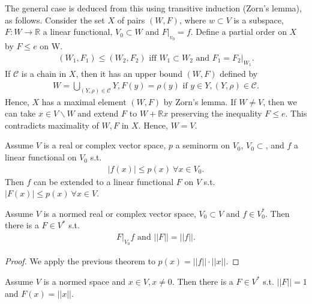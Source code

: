 The general case is deduced from this using transitive induction (Zorn's lemma), as follows. Consider the set \(X\) of pairs \((W,F)\), 
where \(w\subset V\) is a subspace, \(F:W\rightarrow \mathbb{R}\) a linear functional, \(V_0\subset W\) and \(F\vert_{v_0} = f\). Define
a partial order on \(X\) by \(F\leq e\) on W. 
\begin{align*}
    (W_1, F_1) \leq (W_2, F_2) \text{ iff } W_1\subset W_2\text{ and } F_1=F_2\vert_{W_1}.
\end{align*}
If \(\mathcal{C}\) is a chain in \(X\), then it has an upper bound \((W,F)\) defined by
\begin{align*}
    W = \bigcup\limits_{(Y,\rho)\in\mathcal{C}} Y, F(y) = \rho(y) \text{ if } y\in Y, (Y,\rho) \in\mathcal{C}.
\end{align*}
Hence, \(X\) has a maximal element \((W,F)\) by Zorn's lemma. If \(W\neq V\), then we can take \(x\in V\backslash W\) and extend \(F\) to
\(W+\mathbb{R}x\) preserving the inequality \(F\leq e\). This contradicts maximality of \(W,F\) in \(X\). Hence, \(W=V\).
\fi 
\begin{theorem}
    Assume \(V\) is a real or complex vector space, \(p\) a seminorm on \(V_0\), \(V_0\subset\), and \(f\) a linear functional on \(V_0\) s.t.
    \begin{align*}
        |f(x)|\leq p(x) \ \forall x\in V_0.
    \end{align*}
    Then \(f\) can be extended to a linear functional \(F\) on \(V\) s.t. \(|F(x)|\leq p(x) \ \forall x\in V\).
\end{theorem}
\begin{corollary}
    Assume \(V\) is a normed real or complex vector space, \(V_0\subset V\) and \(f\in V_{0}^{*}\). Then there is a \(F\in V^*\) s.t. 
    \begin{align*}
        F\vert_{V_0} f \text{ and } ||F|| = ||f||.
    \end{align*}
\end{corollary}
\ifdetailed
\begin{proof}
    We apply the previous theorem to \(p(x)=||f||\cdot ||x||\).
\end{proof}
\fi 
\begin{corollary}
    Assume \(V\) is a normed space and \(x\in V, x\neq0\). Then there is a \(F\in V^*\) s.t. \(||F||=1\) and \(F(x) = ||x||\).
\end{corollary}

